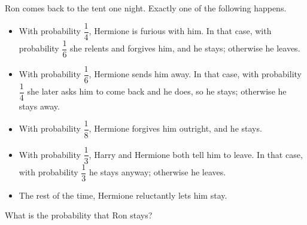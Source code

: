 Ron comes back to the tent one night. Exactly one of the following happens.
\begin{itemize}
\item With probability $\dfrac14$, Hermione is furious with him. In that case, with probability $\dfrac16$ she relents and forgives him, and he stays; otherwise he leaves.
\item With probability $\dfrac16$, Hermione sends him away. In that case, with probability $\dfrac14$ she later asks him to come back and he does, so he stays; otherwise he stays away.
\item With probability $\dfrac18$, Hermione forgives him outright, and he stays.
\item With probability $\dfrac13$, Harry and Hermione both tell him to leave. In that case, with probability $\dfrac13$ he stays anyway; otherwise he leaves.
\item The rest of the time, Hermione reluctantly lets him stay.
\end{itemize}
What is the probability that Ron stays?
